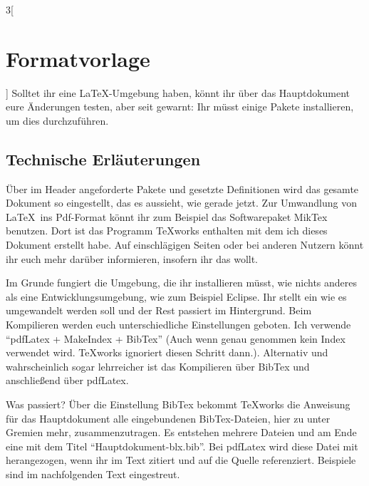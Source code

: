 \begin{multicols}{3}[\section{Formatvorlage}]
Solltet ihr eine \LaTeX-Umgebung haben, könnt ihr über das Hauptdokument eure Änderungen testen, aber seit gewarnt: Ihr müsst einige Pakete installieren, um dies durchzuführen.

\subsection*{Technische Erläuterungen}
Über im Header angeforderte Pakete und gesetzte Definitionen wird das gesamte Dokument so eingestellt, das es aussieht, wie gerade jetzt. Zur Umwandlung von \LaTeX~ins Pdf-Format könnt ihr zum Beispiel das Softwarepaket MikTex benutzen. Dort ist das Programm TeXworks enthalten mit dem ich dieses Dokument erstellt habe. Auf einschlägigen Seiten oder bei anderen Nutzern könnt ihr euch mehr darüber informieren, insofern ihr das wollt. 

Im Grunde fungiert die Umgebung, die ihr installieren müsst, wie nichts anderes als eine Entwicklungsumgebung, wie zum Beispiel Eclipse. Ihr stellt ein wie es umgewandelt werden soll und der Rest passiert im Hintergrund. Beim Kompilieren werden euch unterschiedliche Einstellungen geboten. Ich verwende \enquote{pdfLatex + MakeIndex + BibTex} (Auch wenn genau genommen kein Index verwendet wird. TeXworks ignoriert diesen Schritt dann.). Alternativ und wahrscheinlich sogar lehrreicher ist das Kompilieren über BibTex und anschließend über pdfLatex. 

Was passiert? Über die Einstellung BibTex bekommt TeXworks die Anweisung für das Hauptdokument alle eingebundenen BibTex-Dateien, hier zu unter Gremien mehr, zusammenzutragen. Es entstehen mehrere Dateien und am Ende eine mit dem Titel \enquote{Hauptdokument-blx.bib}. Bei pdfLatex wird diese Datei mit herangezogen, wenn ihr im Text zitiert und auf die Quelle referenziert. Beispiele sind im nachfolgenden Text eingestreut. 


\end{multicols}
